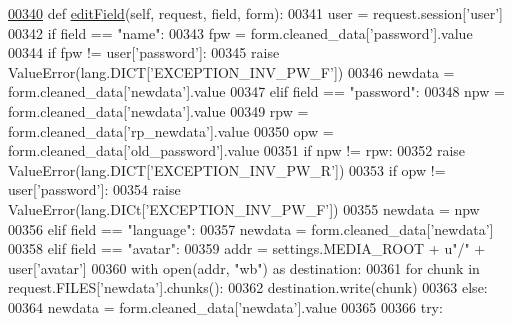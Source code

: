 \begin{DoxyCode}
\hypertarget{classProfile_1_1ProfileUnit_1_1BusProfile_l00340}{}\hyperlink{classProfile_1_1ProfileUnit_1_1BusProfile_a61886054c405cb4d8ccca925dcfbf399}{00340}     \textcolor{keyword}{def }\hyperlink{classProfile_1_1ProfileUnit_1_1BusProfile_a61886054c405cb4d8ccca925dcfbf399}{editField}(self, request, field, form):
00341         user = request.session[\textcolor{stringliteral}{'user'}]
00342         \textcolor{keywordflow}{if} field == \textcolor{stringliteral}{"name"}:
00343             fpw = form.cleaned\_data[\textcolor{stringliteral}{'password'}].value
00344             \textcolor{keywordflow}{if} fpw != user[\textcolor{stringliteral}{'password'}]:
00345                 \textcolor{keywordflow}{raise} ValueError(lang.DICT[\textcolor{stringliteral}{'EXCEPTION\_INV\_PW\_F'}])
00346             newdata = form.cleaned\_data[\textcolor{stringliteral}{'newdata'}].value
00347         \textcolor{keywordflow}{elif} field == \textcolor{stringliteral}{"password"}:
00348             npw = form.cleaned\_data[\textcolor{stringliteral}{'newdata'}].value
00349             rpw = form.cleaned\_data[\textcolor{stringliteral}{'rp\_newdata'}].value
00350             opw = form.cleaned\_data[\textcolor{stringliteral}{'old\_password'}].value
00351             \textcolor{keywordflow}{if} npw != rpw:
00352                 \textcolor{keywordflow}{raise} ValueError(lang.DICT[\textcolor{stringliteral}{'EXCEPTION\_INV\_PW\_R'}])
00353             \textcolor{keywordflow}{if} opw != user[\textcolor{stringliteral}{'password'}]:
00354                 \textcolor{keywordflow}{raise} ValueError(lang.DICt[\textcolor{stringliteral}{'EXCEPTION\_INV\_PW\_F'}])
00355             newdata = npw
00356         \textcolor{keywordflow}{elif} field == \textcolor{stringliteral}{"language"}:
00357             newdata = form.cleaned\_data[\textcolor{stringliteral}{'newdata'}]
00358         \textcolor{keywordflow}{elif} field == \textcolor{stringliteral}{"avatar"}:
00359             addr = settings.MEDIA\_ROOT + \textcolor{stringliteral}{u"/"} + user[\textcolor{stringliteral}{'avatar'}]
00360             with open(addr, \textcolor{stringliteral}{"wb"}) \textcolor{keyword}{as} destination:
00361                     \textcolor{keywordflow}{for} chunk \textcolor{keywordflow}{in} request.FILES[\textcolor{stringliteral}{'newdata'}].chunks():
00362                         destination.write(chunk)
00363         \textcolor{keywordflow}{else}:
00364             newdata = form.cleaned\_data[\textcolor{stringliteral}{'newdata'}].value
00365 
00366         \textcolor{keywordflow}{try}:

\end{DoxyCode}
